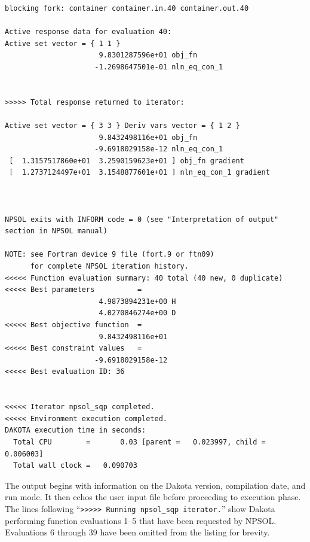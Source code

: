 \begin{small}
\begin{verbatim}
blocking fork: container container.in.40 container.out.40

Active response data for evaluation 40:
Active set vector = { 1 1 }
                      9.8301287596e+01 obj_fn
                     -1.2698647501e-01 nln_eq_con_1


>>>>> Total response returned to iterator:

Active set vector = { 3 3 } Deriv vars vector = { 1 2 }
                      9.8432498116e+01 obj_fn
                     -9.6918029158e-12 nln_eq_con_1
 [  1.3157517860e+01  3.2590159623e+01 ] obj_fn gradient
 [  1.2737124497e+01  3.1548877601e+01 ] nln_eq_con_1 gradient



NPSOL exits with INFORM code = 0 (see "Interpretation of output" section in NPSOL manual)

NOTE: see Fortran device 9 file (fort.9 or ftn09)
      for complete NPSOL iteration history.
<<<<< Function evaluation summary: 40 total (40 new, 0 duplicate)
<<<<< Best parameters          =
                      4.9873894231e+00 H
                      4.0270846274e+00 D
<<<<< Best objective function  =
                      9.8432498116e+01
<<<<< Best constraint values   =
                     -9.6918029158e-12
<<<<< Best evaluation ID: 36


<<<<< Iterator npsol_sqp completed.
<<<<< Environment execution completed.
DAKOTA execution time in seconds:
  Total CPU        =       0.03 [parent =   0.023997, child =   0.006003]
  Total wall clock =   0.090703
\end{verbatim}
\end{small}

The output begins with information on the Dakota version, compilation
date, and run mode.  It then echos the user input file before
proceeding to execution phase.  The lines following ``\texttt{>>>>>
  Running npsol\_sqp iterator.}''  show Dakota performing function
evaluations 1--5 that have been requested by NPSOL. Evaluations 6
through 39 have been omitted from the listing for brevity.

